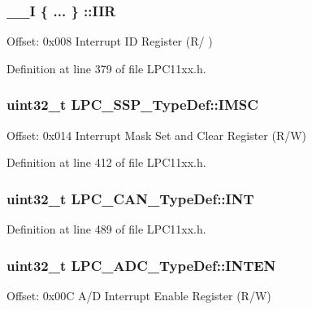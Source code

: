\subsubsection[{\texorpdfstring{I\+IR}{IIR}}]{\setlength{\rightskip}{0pt plus 5cm}\+\_\+\+\_\+I \{ ... \} \+::I\+IR}\hypertarget{group___l_p_c11xx___definitions_ga982467917144ee2dacddfe586a3fe2e2}{}\label{group___l_p_c11xx___definitions_ga982467917144ee2dacddfe586a3fe2e2}
Offset\+: 0x008 Interrupt ID Register (R/ ) 

Definition at line 379 of file L\+P\+C11xx.\+h.

\subsubsection[{\texorpdfstring{I\+M\+SC}{IMSC}}]{ uint32\+\_\+t L\+P\+C\+\_\+\+S\+S\+P\+\_\+\+Type\+Def\+::\+I\+M\+SC}\hypertarget{group___l_p_c11xx___definitions_ga61842512c283fb1c980ec6f04927a62c}{}\label{group___l_p_c11xx___definitions_ga61842512c283fb1c980ec6f04927a62c}
Offset\+: 0x014 Interrupt Mask Set and Clear Register (R/W) 

Definition at line 412 of file L\+P\+C11xx.\+h.

\subsubsection[{\texorpdfstring{I\+NT}{INT}}]{ uint32\+\_\+t L\+P\+C\+\_\+\+C\+A\+N\+\_\+\+Type\+Def\+::\+I\+NT}\hypertarget{group___l_p_c11xx___definitions_ga3019df722c0ccf0e0f0a3480c985d188}{}\label{group___l_p_c11xx___definitions_ga3019df722c0ccf0e0f0a3480c985d188}


Definition at line 489 of file L\+P\+C11xx.\+h.

\subsubsection[{\texorpdfstring{I\+N\+T\+EN}{INTEN}}]{ uint32\+\_\+t L\+P\+C\+\_\+\+A\+D\+C\+\_\+\+Type\+Def\+::\+I\+N\+T\+EN}\hypertarget{group___l_p_c11xx___definitions_gafd88fd018d5d8464442e7c6bbabda5a2}{}\label{group___l_p_c11xx___definitions_gafd88fd018d5d8464442e7c6bbabda5a2}
Offset\+: 0x00C A/D Interrupt Enable Register (R/W) 

